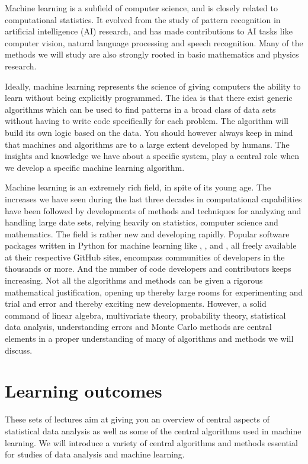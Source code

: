 \documentclass[letterpaper,10pt,english]{sphinxmanual}
\begin{document}
Machine learning is a subfield of computer science, and is closely
related to computational statistics.  It evolved from the study of
pattern recognition in artificial intelligence (AI) research, and has
made contributions to AI tasks like computer vision, natural language
processing and speech recognition. Many of the methods we will study are also
strongly rooted in basic mathematics and physics research.

Ideally, machine learning represents the science of giving computers
the ability to learn without being explicitly programmed.  The idea is
that there exist generic algorithms which can be used to find patterns
in a broad class of data sets without having to write code
specifically for each problem. The algorithm will build its own logic
based on the data.  You should however always keep in mind that
machines and algorithms are to a large extent developed by humans. The
insights and knowledge we have about a specific system, play a central
role when we develop a specific machine learning algorithm.

Machine learning is an extremely rich field, in spite of its young
age. The increases we have seen during the last three decades in
computational capabilities have been followed by developments of
methods and techniques for analyzing and handling large date sets,
relying heavily on statistics, computer science and mathematics.  The
field is rather new and developing rapidly. Popular software packages
written in Python for machine learning like
,
,
 and , all
freely available at their respective GitHub sites, encompass
communities of developers in the thousands or more. And the number of
code developers and contributors keeps increasing. Not all the
algorithms and methods can be given a rigorous mathematical
justification, opening up thereby large rooms for experimenting and
trial and error and thereby exciting new developments.  However, a
solid command of linear algebra, multivariate theory, probability
theory, statistical data analysis, understanding errors and Monte
Carlo methods are central elements in a proper understanding of many
of algorithms and methods we will discuss.


\chapter{Learning outcomes}
\label{\detokenize{chapter1:learning-outcomes}}
These sets of lectures aim at giving you an overview of central aspects of
statistical data analysis as well as some of the central algorithms
used in machine learning.  We will introduce a variety of central
algorithms and methods essential for studies of data analysis and
machine learning.
\end{document}
